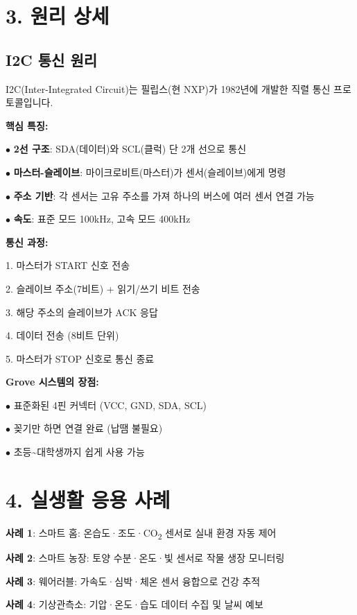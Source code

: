 \documentclass[11pt,a4paper]{article}
\begin{document}
\section*{3. 원리 상세}

\subsection*{I2C 통신 원리}

I2C(Inter-Integrated Circuit)는 필립스(현 NXP)가 1982년에 개발한 직렬 통신 프로토콜입니다.


\textbf{핵심 특징:}

$\bullet$ \textbf{2선 구조}: SDA(데이터)와 SCL(클럭) 단 2개 선으로 통신

$\bullet$ \textbf{마스터-슬레이브}: 마이크로비트(마스터)가 센서(슬레이브)에게 명령

$\bullet$ \textbf{주소 기반}: 각 센서는 고유 주소를 가져 하나의 버스에 여러 센서 연결 가능

$\bullet$ \textbf{속도}: 표준 모드 100kHz, 고속 모드 400kHz


\textbf{통신 과정:}

1. 마스터가 START 신호 전송

2. 슬레이브 주소(7비트) + 읽기/쓰기 비트 전송

3. 해당 주소의 슬레이브가 ACK 응답

4. 데이터 전송 (8비트 단위)

5. 마스터가 STOP 신호로 통신 종료


\textbf{Grove 시스템의 장점:}

$\bullet$ 표준화된 4핀 커넥터 (VCC, GND, SDA, SCL)

$\bullet$ 꽂기만 하면 연결 완료 (납땜 불필요)

$\bullet$ 초등\textasciitilde{}대학생까지 쉽게 사용 가능



\section*{4. 실생활 응용 사례}

\textbf{사례 1}: 스마트 홈: 온습도·조도·CO\textsubscript{2} 센서로 실내 환경 자동 제어


\textbf{사례 2}: 스마트 농장: 토양 수분·온도·빛 센서로 작물 생장 모니터링


\textbf{사례 3}: 웨어러블: 가속도·심박·체온 센서 융합으로 건강 추적


\textbf{사례 4}: 기상관측소: 기압·온도·습도 데이터 수집 및 날씨 예보
\end{document}
